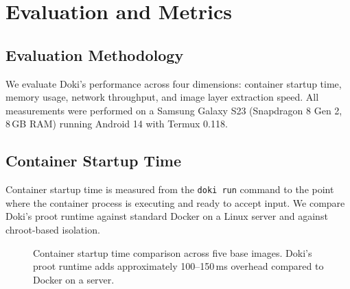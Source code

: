 \chapter{Evaluation and Metrics}
\label{ch:metrics}

\section{Evaluation Methodology}
\label{sec:methodology}

We evaluate Doki's performance across four dimensions: container
startup time, memory usage, network throughput, and image layer
extraction speed. All measurements were performed on a Samsung
Galaxy S23 (Snapdragon 8 Gen 2, 8\,GB RAM) running Android 14
with Termux 0.118.

\section{Container Startup Time}
\label{sec:startup-time}

Container startup time is measured from the \texttt{doki run} command
to the point where the container process is executing and ready to
accept input. We compare Doki's proot runtime against standard Docker
on a Linux server and against chroot-based isolation.

\begin{figure}[htbp]
  \centering
  \caption{Container startup time comparison across five base images.
    Doki's proot runtime adds approximately 100--150\,ms overhead
    compared to Docker on a server.}
  \label{fig:startup-time}
\end{figure}

